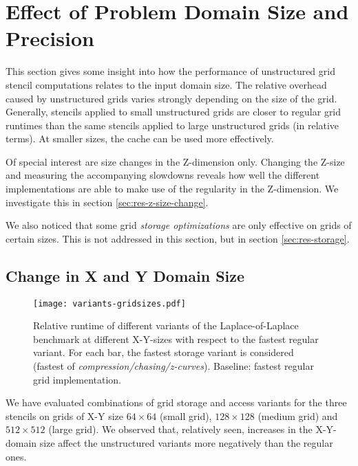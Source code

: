 \section{Effect of Problem Domain Size and Precision} \label{sec:res-size}

This section gives some insight into how the performance of unstructured grid stencil computations relates to the input domain size. The relative overhead caused by unstructured grids varies strongly depending on the size of the grid. Generally, stencils applied to small unstructured grids are closer to regular grid runtimes than the same stencils applied to large unstructured grids (in relative terms). At smaller sizes, the cache can be used more effectively.

Of special interest are size changes in the Z-dimension only. Changing the Z-size and measuring the accompanying slowdowns reveals how well the different implementations are able to make use of the regularity in the Z-dimension. We investigate this in section \ref{sec:res-z-size-change}.

We also noticed that some grid \emph{storage optimizations} are only effective on grids of certain sizes. This is not addressed in this section, but in section \ref{sec:res-storage}.

\subsection{Change in X and Y Domain Size}

\begin{figure}
	\begin{center}
    \texttt{[image: variants-gridsizes.pdf]}
	\end{center}
    \caption{\label{fig:variants-gridsizes} Relative runtime of different variants of the Laplace-of-Laplace benchmark at different X-Y-sizes with respect to the fastest regular variant. For each bar, the fastest storage variant is considered (fastest of \emph{compression/chasing/z-curves}). Baseline: fastest regular grid implementation.}
\end{figure}

We have evaluated combinations of grid storage and access variants for the three stencils on grids of X-Y size $64\times 64$ (small grid), $128\times 128$ (medium grid) and $512\times 512$ (large grid). We observed that, relatively seen, increases in the X-Y-domain size affect the unstructured variants more negatively than the regular ones.

